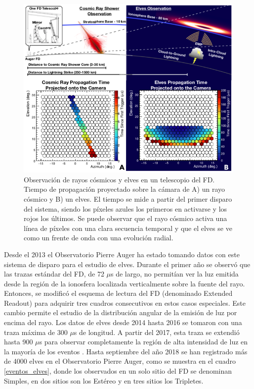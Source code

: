 \documentclass[12pt,oneside,openany,letter]{book}
\begin{document}
\begin{figure} 

    \centering
    \includegraphics[scale=0.6]{figures/cr_vs_elves.png}
    \caption[Observaci\'on de rayos c\'osmicos y elves en un telescopio del FD del Observatorio Pierre Auger]{Observaci\'on de rayos c\'osmicos y elves en un telescopio del FD. Tiempo de propagaci\'on proyectado sobre la c\'amara
    de A) un rayo c\'osmico y B) un elves. El tiempo se mide a partir del primer disparo del sistema, siendo los p\'ixeles azules los primeros en activarse y los rojos los \'ultimos. Se puede observar que el rayo c\'osmico activa una l\'inea de p\'ixeles con una clara secuencia temporal y que el elves se ve como un frente de onda con una evolución radial.
    }
    \label{fig:crs_elves}
\end{figure}

Desde el 2013 el Observatorio Pierre Auger ha estado tomando datos con este sistema de disparo para el estudio de elves. Durante el primer año se observ\'o que las trazas estándar del FD, de 72 $\mu$s de largo, no permit\'ian ver la luz emitida desde la regi\'on de la ionosfera localizada verticalmente sobre la fuente del rayo. Entonces, se modific\'o el esquema de lectura del FD (denominado Extended Readout) para adquirir tres cuadros consecutivos en estos casos especiales. Este cambio permite el estudio de la distribuci\'on angular de la emisi\'on de luz por encima del rayo. Los datos de elves desde 2014 hasta 2016 se tomaron con una traza m\'axima de 300 $\mu$s de longitud. A partir del 2017, esta traza se extendi\'o hasta 900 $\mu$s para observar completamente la regi\'on de alta intensidad de luz en la mayor\'ia de los eventos \cite{Mussa2019}. Hasta septiembre del año 2018 se han registrado m\'as de 4000 elves en el Observatorio Pierre Auger, como se muestra en el cuadro \ref{eventos_elves}, donde los observados en un solo sitio del FD se denominan Simples, en dos sitios son los Estéreo y en tres sitios los Tripletes.  
\end{document}
